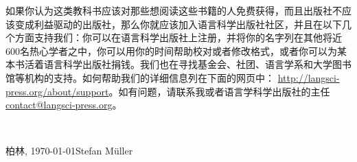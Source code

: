 如果你认为这类教科书应该对那些想阅读这些书籍的人免费获得，而且出版社不应该变成利益驱动的出版社，那么你就应该加入语言科学出版社社区，并且在以下几个方面支持我们：你可以在语言科学出版社上注册，并将你的名字列在其他将近600名热心学者之中，你可以用你的时间帮助校对或者修改格式，或者你可以为某本书活着语言科学出版社捐钱。我们也在寻找基金会、社团、语言学系和大学图书馆等机构的支持。如何帮助我们的详细信息列在下面的网页中： \url{http://langsci-press.org/about/support}。如有问题，请联系我或者语言学科学出版社的主任\href{mailto:contact@langsci-press.org}{contact@langsci-press.org}。


~\medskip

\noindent
柏林, \today\hfill Stefan Müller

